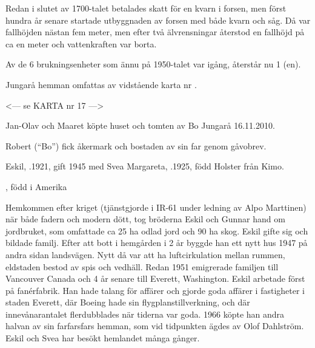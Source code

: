 Redan i slutet av 1700-talet betalades skatt för en kvarn i forsen, men först hundra år senare startade utbyggnaden av forsen med både kvarn och såg. Då var fallhöjden nästan fem meter, men efter två älvrensningar återstod en fallhöjd på ca en meter och vattenkraften var borta.

Av de 6 brukningsenheter som ännu på 1950-talet var igång, återstår nu 1 (en).


Jungarå hemman omfattas av vidstående karta nr .


<--- se KARTA nr 17 --->


%



%



%
Jan-Olav och Maaret köpte huset och tomten av Bo Jungarå 16.11.2010.\jhvspace{}


%
Robert (``Bo'') fick åkermark och bostaden av sin far genom gåvobrev.\jhvspace{}


%
Eskil, .1921, gift 1945 med Svea Margareta, .1925, född Holster från Kimo.
\begin{jhchildren}
  \item {}
  \item {}, född i Amerika
\end{jhchildren}

Hemkommen efter kriget (tjänstgjorde i IR-61 under ledning av Alpo 	Marttinen) när både fadern och modern dött, tog bröderna Eskil och Gunnar hand om jordbruket, som omfattade ca 25 ha odlad jord och 90 ha skog. Eskil gifte sig och bildade familj. Efter att bott i hemgården i 2 år byggde han ett nytt hus 1947 på andra sidan landsvägen. Nytt då var att ha luftcirkulation mellan rummen, eldstaden bestod av spis och vedhäll. Redan 1951 emigrerade familjen till Vancouver 	Canada och 4 år senare till Everett, Washington. Eskil arbetade först på fanérfabrik. Han hade talang för affärer och gjorde goda affärer i fastigheter i staden Everett, där Boeing hade sin flygplanstillverkning, och där innevånarantalet flerdubblades när tiderna var goda. 1966 köpte han andra halvan av sin farfarsfars hemman, som vid tidpunkten ägdes av Olof Dahlström. Eskil och Svea har besökt hemlandet många gånger.


